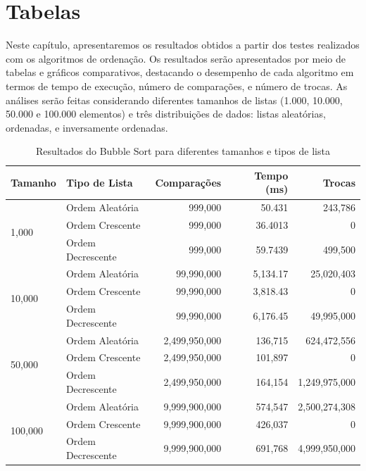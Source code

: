 \documentclass[tcc1,project]{uftex}
\begin{document}
\section{Tabelas}
Neste capítulo, apresentaremos os resultados obtidos a partir dos testes realizados com os algoritmos de ordenação. Os resultados serão apresentados por meio de tabelas e gráficos comparativos, destacando o desempenho de cada algoritmo em termos de tempo de execução, número de comparações, e número de trocas. As análises serão feitas considerando diferentes tamanhos de listas (1.000, 10.000, 50.000 e 100.000 elementos) e três distribuições de dados: listas aleatórias, ordenadas, e inversamente ordenadas.

\begin{table}[h]
\centering
\caption{Resultados do Bubble Sort para diferentes tamanhos e tipos de lista}
\begin{tabular}{llrrr}
\toprule
\textbf{Tamanho} & \textbf{Tipo de Lista} & \textbf{Comparações} & \textbf{Tempo (ms)} & \textbf{Trocas} \\
\midrule
\multirow{3}{*}{1,000}   & Ordem Aleatória   & 999,000  & 50.431    & 243,786 \\
                         & Ordem Crescente   & 999,000  & 36.4013   & 0 \\
                         & Ordem Decrescente & 999,000  & 59.7439   & 499,500 \\
\midrule
\multirow{3}{*}{10,000}  & Ordem Aleatória   & 99,990,000  & 5,134.17   & 25,020,403 \\
                         & Ordem Crescente   & 99,990,000  & 3,818.43   & 0 \\
                         & Ordem Decrescente & 99,990,000  & 6,176.45   & 49,995,000 \\
\midrule
\multirow{3}{*}{50,000}  & Ordem Aleatória   & 2,499,950,000  & 136,715  & 624,472,556 \\
                         & Ordem Crescente   & 2,499,950,000  & 101,897  & 0 \\
                         & Ordem Decrescente & 2,499,950,000  & 164,154  & 1,249,975,000 \\
\midrule
\multirow{3}{*}{100,000} & Ordem Aleatória   & 9,999,900,000  & 574,547  & 2,500,274,308 \\
                         & Ordem Crescente   & 9,999,900,000  & 426,037  & 0 \\
                         & Ordem Decrescente & 9,999,900,000  & 691,768  & 4,999,950,000 \\
\bottomrule
\end{tabular}
\end{table}
\end{document}
